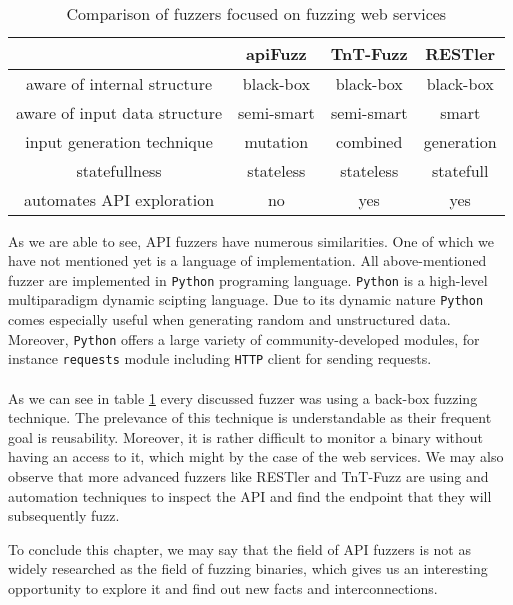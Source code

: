 \paragraph{}
\begin{table}[h]
\begin{center}
\begin{tabular}{|c|c c c|}
\hline
                              & apiFuzz    & TnT-Fuzz   & RESTler    \\
\hline
aware of internal structure   & black-box  & black-box  & black-box  \\
aware of input data structure & semi-smart & semi-smart & smart      \\
input generation technique    & mutation   & combined   & generation \\
statefullness                 & stateless  & stateless  & statefull  \\
automates API exploration     & no         & yes        & yes        \\
\hline
\end{tabular}
\caption{Comparison of fuzzers focused on fuzzing web services}
\label{table:fuzzers-comparison}
\end{center}
\end{table}

As we are able to see, API fuzzers have numerous similarities. One of which we have not mentioned yet is a language of implementation. All above-mentioned fuzzer are implemented in \texttt{Python} programing language. \texttt{Python} is a high-level multiparadigm dynamic scipting language. Due to its dynamic nature \texttt{Python} comes especially useful when generating random and unstructured data. Moreover, \texttt{Python} offers a large variety of community-developed modules, for instance \texttt{requests} module including \texttt{HTTP} client for sending requests.

\paragraph{}
As we can see in table \ref{table:fuzzers-comparison} every discussed fuzzer was using a back-box fuzzing technique. The prelevance of this technique is understandable as their frequent goal is reusability. Moreover, it is rather difficult to monitor a binary without having an access to it, which might by the case of the web services. We may also observe that more advanced fuzzers like RESTler and TnT-Fuzz are using and automation techniques to inspect the API and find the endpoint that they will subsequently fuzz.

To conclude this chapter, we may say that the field of API fuzzers is not as widely researched as the field of fuzzing binaries, which gives us an interesting opportunity to explore it and find out new facts and interconnections.
